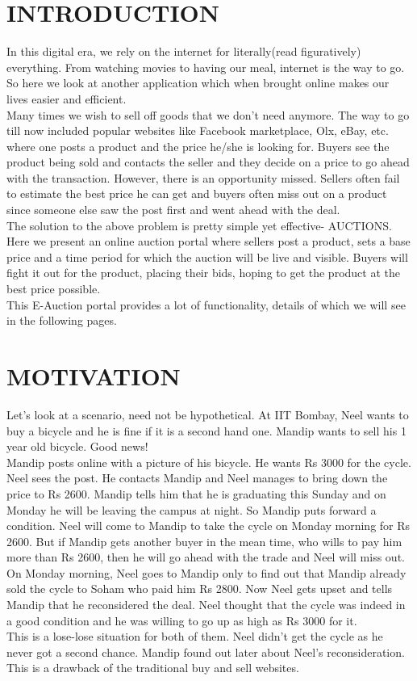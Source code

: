\documentclass[12pt]{article}
\begin{document}
\section{INTRODUCTION}
In this digital era, we rely on the internet for literally(read figuratively) everything. From watching movies to having our meal, internet is the way to go. So here we look at another application which when brought online makes our lives easier and efficient.\\
Many times we wish to sell off goods that we don't need anymore. The way to go till now included popular websites like Facebook marketplace, Olx, eBay, etc. where one posts a product and the price he/she is looking for. Buyers see the product being sold and contacts the seller and they decide on a price to go ahead with the transaction. However, there is an opportunity missed. Sellers often fail to estimate the best price he can get and buyers often miss out on a product since someone else saw the post first and went ahead with the deal.\\
The solution to the above problem is pretty simple yet effective- AUCTIONS. Here we present an online auction portal where sellers post a product, sets a base price and a time period for which the auction will be live and visible. Buyers will fight it out for the product, placing their bids, hoping to get the product at the best price possible.\\
This E-Auction portal provides a lot of functionality, details of which we will see in the following pages.

\section{MOTIVATION}
Let's look at a scenario, need not be hypothetical. At IIT Bombay, Neel wants to buy a bicycle and he is fine if it is a second hand one. Mandip wants to sell his 1 year old bicycle. Good news!\\
Mandip posts online with a picture of his bicycle. He wants Rs 3000 for the cycle. Neel sees the post. He contacts Mandip and Neel manages to bring down the price to Rs 2600. Mandip tells him that he is graduating this Sunday and on Monday he will be leaving the campus at night. So Mandip puts forward a condition. Neel will come to Mandip to take the cycle on Monday morning for Rs 2600. But if Mandip gets another buyer in the mean time, who wills to pay him more than Rs 2600, then he will go ahead with the trade and Neel will miss out.\\
On Monday morning, Neel goes to Mandip only to find out that Mandip already sold the cycle to Soham who paid him Rs 2800. Now Neel gets upset and tells Mandip that he reconsidered the deal. Neel thought that the cycle was indeed in a good condition and he was willing to go up as high as Rs 3000 for it.\\
This is a lose-lose situation for both of them. Neel didn't get the cycle as he never got a second chance. Mandip found out later about Neel's reconsideration. This is a drawback of the traditional buy and sell websites.\\
\end{document}
